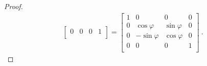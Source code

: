 \begin{example}
\begin{proof}
\begin{equation*}
\begin{aligned}
\begin{bmatrix}
                    0 & 0 & 0 & 1 \\
                \end{bmatrix} = \begin{bmatrix}
                    1 & 0 & 0 & 0 \\
                    0 & \cos \varphi & \sin \varphi & 0 \\
                    0 & - \sin \varphi & \cos \varphi & 0 \\
                    0 & 0 & 0 & 1 \\
                \end{bmatrix} ~.
            \end{aligned}
            \end{equation*}
        \end{proof}


\end{example}
